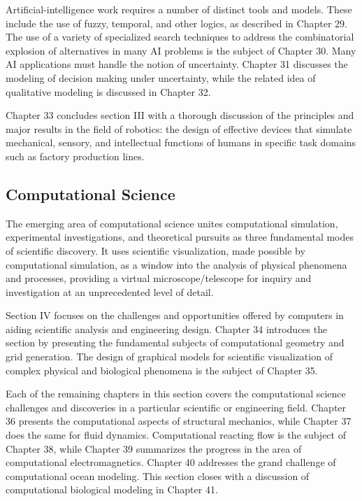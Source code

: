 Artificial-intelligence work requires a number of distinct tools
and models. These include the use of fuzzy, temporal, and other
logics, as described in Chapter 29. The use of a variety of
specialized search techniques to address the combinatorial
explosion of alternatives in many AI problems is the subject of
Chapter 30. Many AI applications must handle the notion of
uncertainty.  Chapter 31 discusses the modeling of decision
making under uncertainty, while the related idea of qualitative
modeling is discussed in Chapter 32.

Chapter 33 concludes section III with a thorough discussion of the
principles and major results in the field of robotics: the
design of effective devices that simulate mechanical, sensory,
and intellectual functions of humans in specific task domains
such as factory production lines.

\enlargethispage{-0.7pc}
\subsection{Computational Science}

The emerging area of computational science unites computational
simulation, experimental investigations, and theoretical
pursuits as three fundamental modes of scientific discovery. It
uses scientific visualization, made possible by computational
simulation, as a window into the analysis of physical phenomena
and processes, providing a virtual microscope/telescope for
inquiry and investigation at an unprecedented level of detail.

Section IV focuses on the challenges and opportunities offered
by computers in aiding scientific analysis and engineering
design. Chapter 34 introduces the section by presenting the
fundamental subjects of computational geometry and grid
generation. The design of graphical models for scientific
visualization of complex physical and biological phenomena is
the subject of Chapter 35.

Each of the remaining chapters in this section covers the
computational science challenges and discoveries in a particular
scientific or engineering field. Chapter 36 presents the
computational aspects of structural mechanics, while Chapter 37
does the same for fluid dynamics. Computational reacting flow is
the subject of Chapter 38, while Chapter 39 summarizes the
progress in the area of computational electromagnetics. Chapter
40 addresses the grand challenge of computational ocean
modeling. This section closes with a discussion of computational
biological modeling in Chapter 41.

